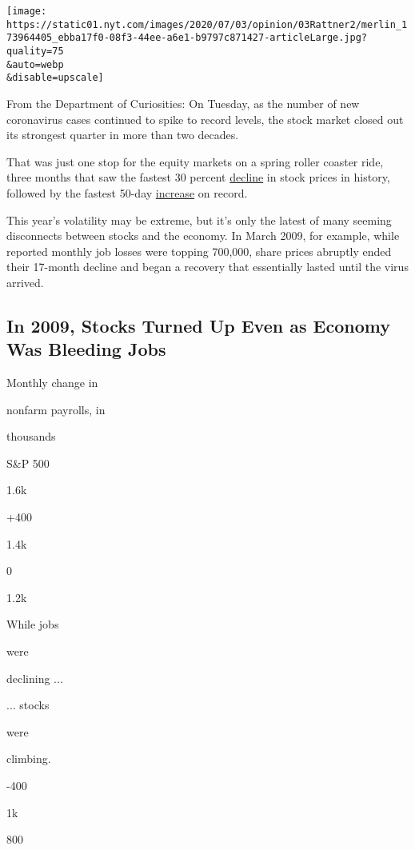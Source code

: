 \texttt{[image: https://static01.nyt.com/images/2020/07/03/opinion/03Rattner2/merlin\_173964405\_ebba17f0-08f3-44ee-a6e1-b9797c871427-articleLarge.jpg?quality=75\\\&auto=webp\\\&disable=upscale]}

From the Department of Curiosities: On Tuesday, as the number of new
coronavirus cases continued to spike to record levels, the stock market
closed out its strongest quarter in more than two decades.

That was just one stop for the equity markets on a spring roller coaster
ride, three months that saw the fastest 30 percent
\href{https://www.cnbc.com/2020/03/23/this-was-the-fastest-30percent-stock-market-decline-ever.html}{decline}
in stock prices in history, followed by the fastest 50-day
\href{https://www.cnbc.com/2020/06/03/this-is-the-greatest-50-day-rally-in-the-history-of-the-sp-500.html}{increase}
on record.

This year's volatility may be extreme, but it's only the latest of many
seeming disconnects between stocks and the economy. In March 2009, for
example, while reported monthly job losses were topping 700,000, share
prices abruptly ended their 17-month decline and began a recovery that
essentially lasted until the virus arrived.

\hypertarget{in-2009-stocks-turned-up-even-as-economy-was-bleeding-jobs}{%
\subsection{In 2009, Stocks Turned Up Even as Economy Was Bleeding
Jobs}\label{in-2009-stocks-turned-up-even-as-economy-was-bleeding-jobs}}

Monthly change in

nonfarm payrolls, in

thousands

S\&P 500

1.6k

+400

1.4k

0

1.2k

While jobs

were

declining ...

... stocks

were

climbing.

-400

1k

800

